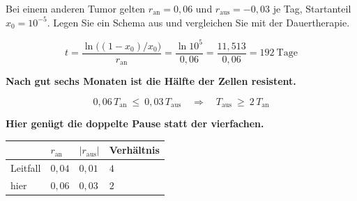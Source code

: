 \begin{aufgabe}
Bei einem anderen Tumor gelten $r_{\text{an}} = 0{,}06$ und $r_{\text{aus}} = -0{,}03$ je Tag, Startanteil $x_0 = 10^{-5}$. Legen Sie ein Schema aus und vergleichen Sie mit der Dauertherapie.

\loesung
{}
\[ t = \frac{\ln\bigl((1-x_0)/x_0\bigr)}{r_{\text{an}}} = \frac{\ln 10^{5}}{0{,}06} = \frac{11{,}513}{0{,}06} = 192 \ \text{Tage} \]

\begin{center}
\begin{minipage}{0.9\textwidth}
\textbf{Nach gut sechs Monaten ist die Hälfte der Zellen resistent.}
\end{minipage}
\end{center}

\[ 0{,}06\,T_{\text{an}} \ \le\ 0{,}03\,T_{\text{aus}} \quad\Longrightarrow\quad T_{\text{aus}} \ \ge\ 2\,T_{\text{an}} \]

\begin{center}
\begin{minipage}{0.9\textwidth}
\textbf{Hier genügt die doppelte Pause statt der vierfachen.}
\end{minipage}
\end{center}

\begin{center}
{\small
\renewcommand{\arraystretch}{1.5}
\begin{tabular}{@{}P{2.4cm}P{2.0cm}P{2.0cm}P{2.0cm}@{}}
\toprule
& $r_{\text{an}}$ & $|r_{\text{aus}}|$ & \textbf{Verhältnis}\\
\midrule
Leitfall & $0{,}04$ & $0{,}01$ & $4$\\
hier & $0{,}06$ & $0{,}03$ & $2$\\
\bottomrule
\end{tabular}}
\end{center}

\begin{center}
\begin{minipage}{0.88\textwidth}
\end{minipage}
\end{center}


\end{aufgabe}
